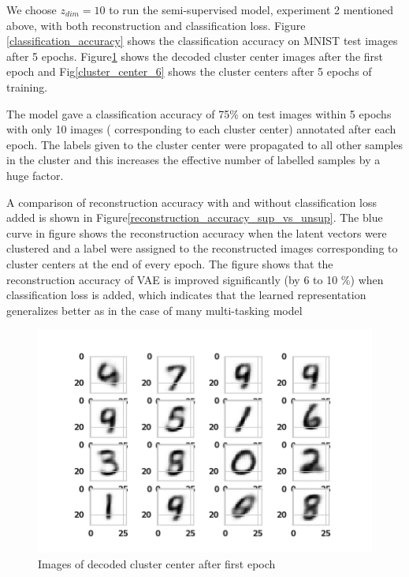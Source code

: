 \documentclass{uai2021} %
\begin{document}
We choose $z_{dim}=10$ to run the  semi-supervised model, experiment 2 mentioned above,  with both reconstruction and classification loss.
Figure \ref{classification_accuracy} shows the classification accuracy on MNIST test images after 5 epochs.
Figure\ref{cluster_center_1} shows the decoded cluster center images after the first epoch and Fig\ref{cluster_center_6} shows the cluster centers after 5 epochs of training.


The model gave a classification accuracy of 75\% on test images within 5 epochs with only 10 images ( corresponding to each  cluster center) annotated after each epoch.
The labels given to the cluster center were propagated to all other samples in the cluster and this increases the effective number of labelled samples by a huge factor.

A comparison of reconstruction accuracy with and without classification loss added is shown in Figure\ref{reconstruction_accuracy_sup_vs_unsup}.
The blue curve in figure shows the reconstruction accuracy when the latent vectors were clustered and a label were assigned to the reconstructed images corresponding to  cluster centers at the end of every epoch.
The figure shows that the reconstruction accuracy of VAE is improved significantly  (by 6 to 10 \%) when classification loss is added, which indicates that the learned representation generalizes better as in the case of many multi-tasking model


\begin{figure}[]
\centering
\includegraphics[width=\linewidth]{cluster_centers_epoch_1.0}
\caption{Images of decoded cluster center after first epoch}
\label{cluster_center_1}
\end{figure}
\end{document}
